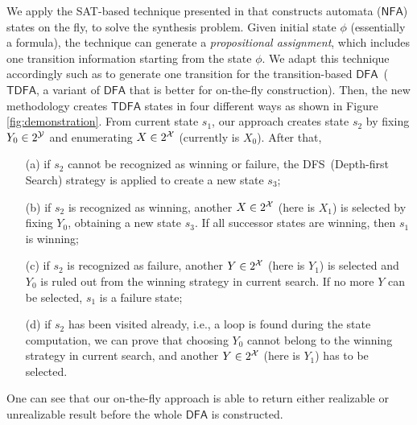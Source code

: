 \documentclass[letterpaper]{article} %
\def\dfa{$\mathsf{DFA}$\xspace}
\def\DFA{$\mathsf{DFA}$\xspace}
\def\NFA{$\mathsf{NFA}$\xspace}
\def\tdfa{$\mathsf{TDFA}$\xspace}
\def\SAT{\textsf{SAT}\xspace}
\begin{document}
We apply the \SAT-based technique presented in \cite{LRPZV19} that constructs automata (\NFA) states on the fly, to solve the synthesis problem. Given initial state $\phi$ (essentially a formula), the technique can generate a \emph{propositional assignment}, which includes one transition information starting from the state $\phi$. We adapt this technique accordingly such as to generate one transition for the transition-based \DFA~(\tdfa, a variant of \dfa that is better for on-the-fly construction). Then, the new methodology creates \tdfa states in four different ways as shown in Figure \ref{fig:demonstration}. From current state $s_1$, our approach creates state $s_2$ by fixing $Y_0\in 2^{\mathcal{Y}}$ and enumerating $X\in 2^{\mathcal{X}}$ (currently is $X_0$). After that,
\begin{itemize}
    \item[(a)]  if $s_2$ cannot be recognized as winning or failure, the DFS~(Depth-first Search) strategy is applied to create a new state $s_3$;
    \item[(b)] if $s_2$ is recognized as winning, another $X\in 2^{\mathcal{X}}$ (here is $X_1$) is selected by fixing $Y_0$, obtaining a new state $s_3$. If all successor states are winning, then $s_1$ is winning;
    \item[(c)] if $s_2$ is recognized as failure, another $Y\in 2^{\mathcal{X}}$ (here is $Y_1$) is selected and $Y_0$ is ruled out from the winning strategy in current search. If no more $Y$ can be selected, $s_1$ is a failure state;
    \item[(d)] if $s_2$ has been visited already, i.e., a loop is found during the state computation, we can prove that choosing $Y_0$ cannot belong to the winning strategy in current search, and another $Y\in 2^{\mathcal{X}}$ (here is $Y_1$) has to be selected. 
\end{itemize}

One can see that our on-the-fly approach is able to return either realizable or unrealizable result before the whole \dfa is constructed. 
\end{document}
